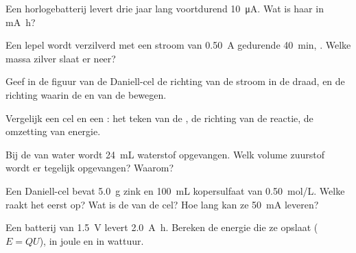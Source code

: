 \begin{exercise}[$\star\star$]\label{exo:g12:cells-and-electrolysis:7}
Een horlogebatterij levert drie jaar lang voortdurend \qty{10}{\micro A}.
Wat is haar  in \si{mA.h}?
\end{exercise}

\begin{exercise}[$\star\star$]\label{exo:g12:cells-and-electrolysis:8}
Een lepel wordt verzilverd met een stroom van \qty{0.50}{A} gedurende
\qty{40}{min}, . Welke massa zilver slaat er neer?
\end{exercise}

\begin{exercise}[$\star\star$]\label{exo:g12:cells-and-electrolysis:9}
Geef in de figuur van de Daniell-cel de richting van de stroom in de
draad, en de richting waarin de   en  van de
 bewegen.
\end{exercise}

\begin{exercise}[$\star\star$]\label{exo:g12:cells-and-electrolysis:10}
Vergelijk een cel en een : het teken van de , de richting
van de reactie, de omzetting van energie.
\end{exercise}

\begin{exercise}[$\star\star$]\label{exo:g12:cells-and-electrolysis:11}
Bij de  van water wordt \qty{24}{mL} waterstof opgevangen.
Welk volume zuurstof wordt er tegelijk opgevangen? Waarom?
\end{exercise}

\begin{exercise}[$\star\star\star$]\label{exo:g12:cells-and-electrolysis:12}
Een Daniell-cel bevat \qty{5.0}{g} zink en \qty{100}{mL} kopersulfaat van
\qty{0.50}{mol/L}. Welke  raakt het eerst op? Wat is de
 van de cel? Hoe lang kan ze \qty{50}{mA} leveren?
\end{exercise}

\begin{exercise}[$\star\star\star$]\label{exo:g12:cells-and-electrolysis:13}
Een batterij van \qty{1.5}{V} levert \qty{2.0}{A.h}. Bereken de energie
die ze opslaat ($E = Q U$), in joule en in wattuur.
\end{exercise}


